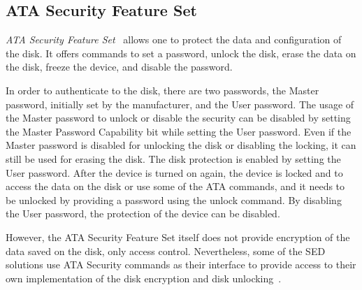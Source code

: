 





\subsection{ATA Security Feature Set}
\label{subsection:enc_ata}

\emph{ATA Security Feature Set}~\cite{acs-3} allows one to protect the data and configuration of the disk.
It offers commands to set a password, unlock the disk, erase the data on the disk, freeze the device, and disable the password.

In order to authenticate to the disk, there are two passwords, the Master password, initially set by the manufacturer, and the User password.
The usage of the Master password to unlock or disable the security can be disabled by setting the Master Password Capability bit while setting the User password. Even if the Master password is disabled for unlocking the disk or disabling the locking, it can still be used for erasing the disk.
The disk protection is enabled by setting the User password. After the device is turned on again, the device is locked and to access the data on the disk or use some of the ATA commands, and it needs to be unlocked by providing a password using the unlock command. By disabling the User password, the protection of the device can be disabled.

However, the ATA Security Feature Set itself does not provide encryption of the data saved on the disk, only access control.
Nevertheless, some of the SED solutions use ATA Security commands as their interface to provide access to their own implementation of the disk encryption and disk unlocking~\cite{self_encrypting_deception}.

